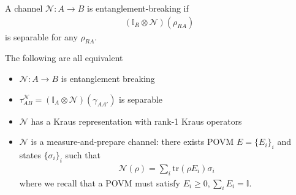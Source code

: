 \documentclass[../../note.tex]{subfiles}
\begin{document}
\begin{definition}
A channel $\mathcal{N}: A\rightarrow B$ is entanglement-breaking if 
\begin{align}
    (\mathbb{I}_R \otimes \mathcal{N})(\rho_{RA}) 
\end{align}
is separable for any $\rho_{RA}$.
\end{definition}

\begin{proposition}
The following are all equivalent
\begin{itemize}
    \item $\mathcal{N}: A\rightarrow B$ is entanglement breaking
    \item $\tau_{AB}^{\mathcal{N}}=(\mathbb{I}_A \otimes \mathcal{N})(\gamma_{AA'})$ is separable 
    \item $\mathcal{N}$ has a Kraus representation with rank-1 Kraus operators 
    \item $\mathcal{N}$ is a measure-and-prepare channel: there exists POVM $E=\{E_i\}_i$ and states $\{\sigma_i\}_i$ such that 
    \begin{align}
        \mathcal{N}(\rho) = \sum_i \text{tr}(\rho E_i) \sigma_i
    \end{align}
    where we recall that a POVM must satisfy $E_i \geq 0, \sum_i E_i = \mathbb{I}$.
\end{itemize}
\end{proposition}
\end{document}
